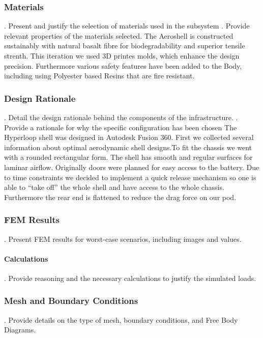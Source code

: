 \subsubsection{Materials}
.  Present and justify the selection of materials used in the subsystem
.  Provide relevant properties of the materials selected.
The Aeroshell is constructed sustainably with natural basalt fibre for biodegradability and superior tensile strenth. This iteration we used 3D printes molds, which enhance the design precision. Furthermore various safety features have been added to the Body, including using Polyester based Resins that are fire resistant.
\par %

\subsubsection{Design Rationale}
.  Detail the design rationale behind the components of the infrastructure.
.  Provide a rationale for why the specific configuration has been chosen
\newline
The Hyperloop shell was designed in Autodesk Fusion 360. First we collected several information about optimal aerodynamic shell designs.To fit the chassis we went with a rounded rectangular form. The shell has smooth and regular surfaces for laminar airflow. Originally doors were planned for easy access to the battery. Due to time constraints we decided to implement a quick release mechanism so one is able to “take off” the whole shell and have access to the whole chassis. Furthermore the rear end is flattened to reduce the drag force on our pod.
\par %


\subsubsection{FEM Results}
.  Present FEM results for worst-case scenarios, including images and values.
\paragraph{Calculations}
.  Provide reasoning and the necessary calculations to justify the simulated loads.
\subsubsection{Mesh and Boundary Conditions}
.  Provide details on the type of mesh, boundary conditions, and Free Body Diagrams.


